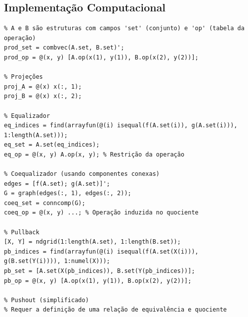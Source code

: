 \subsection{Implementação Computacional}
\begin{lstlisting}[caption={Construções Universais em Mag}]
% Produto e Projeções
% A e B são estruturas com campos 'set' (conjunto) e 'op' (tabela da operação)
prod_set = combvec(A.set, B.set)';
prod_op = @(x, y) [A.op(x(1), y(1)), B.op(x(2), y(2))];

% Projeções
proj_A = @(x) x(:, 1);
proj_B = @(x) x(:, 2);

% Equalizador
eq_indices = find(arrayfun(@(i) isequal(f(A.set(i)), g(A.set(i))), 1:length(A.set)));
eq_set = A.set(eq_indices);
eq_op = @(x, y) A.op(x, y); % Restrição da operação

% Coequalizador (usando componentes conexas)
edges = [f(A.set); g(A.set)]';
G = graph(edges(:, 1), edges(:, 2));
coeq_set = conncomp(G);
coeq_op = @(x, y) ...; % Operação induzida no quociente

% Pullback
[X, Y] = ndgrid(1:length(A.set), 1:length(B.set));
pb_indices = find(arrayfun(@(i) isequal(f(A.set(X(i))), g(B.set(Y(i)))), 1:numel(X)));
pb_set = [A.set(X(pb_indices)), B.set(Y(pb_indices))];
pb_op = @(x, y) [A.op(x(1), y(1)), B.op(x(2), y(2))];

% Pushout (simplificado)
% Requer a definição de uma relação de equivalência e quociente
\end{lstlisting}